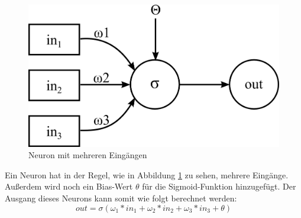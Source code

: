 \begin{figure}
	\centering
	\includegraphics[scale=1]{images/neuron-multiple-inputs.png}
	\caption{Neuron mit mehreren Eingängen}
	\label{fig:neuron-multiple-inputs}
\end{figure}

Ein Neuron hat in der Regel, wie in Abbildung \ref{fig:neuron-multiple-inputs} zu sehen, mehrere Eingänge. Außerdem wird noch ein Bias-Wert $\theta$ für die Sigmoid-Funktion hinzugefügt. Der Ausgang dieses Neurons kann somit wie folgt berechnet werden:
$$out = \sigma(\omega_1*in_1 + \omega_2*in_2 + \omega_3*in_3 + \theta)$$

